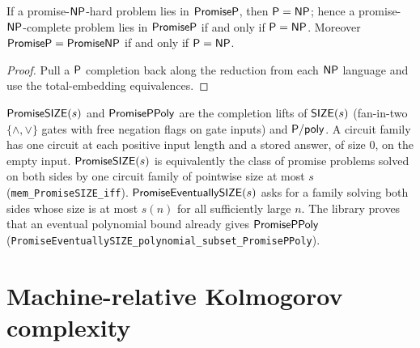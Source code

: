 \begin{theorem}
  \label{thm:meta-promise-collapse}
  \leanok
  If a promise-$\mathsf{NP}$-hard problem lies in $\mathsf{PromiseP}$, then
  $\mathsf{P} = \mathsf{NP}$; hence a promise-$\mathsf{NP}$-complete problem lies in
  $\mathsf{PromiseP}$ if and only if $\mathsf{P} = \mathsf{NP}$. Moreover
  $\mathsf{PromiseP} = \mathsf{PromiseNP}$ if and only if $\mathsf{P} = \mathsf{NP}$.
\end{theorem}
\begin{proof}
  \leanok
  Pull a $\mathsf{P}$ completion back along the reduction from each $\mathsf{NP}$
  language and use the total-embedding equivalences.
\end{proof}

\begin{definition}
  \label{def:meta-promise-size}
  \leanok
  $\mathsf{PromiseSIZE}(s)$ and $\mathsf{PromisePPoly}$ are the completion lifts of
  $\mathsf{SIZE}(s)$ (fan-in-two $\{\wedge,\vee\}$ gates with free negation
  flags on gate inputs) and $\mathsf{P/poly}$. A circuit family has one circuit at
  each positive input length and a stored answer, of size $0$, on the empty
  input. $\mathsf{PromiseSIZE}(s)$ is equivalently the class of promise problems
  solved on both sides by one circuit family of pointwise size at most $s$
  (\texttt{mem\_PromiseSIZE\_iff}). $\mathsf{PromiseEventuallySIZE}(s)$ asks for a
  family solving both sides whose size is at most $s(n)$ for all sufficiently
  large $n$. The library proves that an eventual polynomial bound already
  gives $\mathsf{PromisePPoly}$
  (\texttt{PromiseEventuallySIZE\_polynomial\_subset\_PromisePPoly}).
\end{definition}

\section{Machine-relative Kolmogorov complexity}

